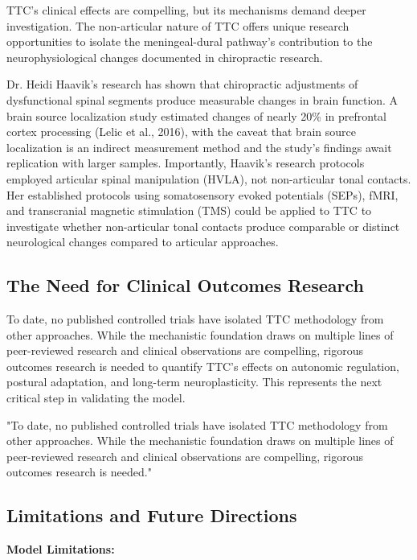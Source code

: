 \documentclass[11pt,letterpaper]{article}
\begin{document}
TTC's clinical effects are compelling, but its mechanisms demand deeper investigation. The non-articular nature of TTC offers unique research opportunities to isolate the meningeal-dural pathway's contribution to the neurophysiological changes documented in chiropractic research.


Dr. Heidi Haavik's research has shown that chiropractic adjustments of dysfunctional spinal segments produce measurable changes in brain function. A brain source localization study estimated changes of nearly 20\% in prefrontal cortex processing (Lelic et al., 2016), with the caveat that brain source localization is an indirect measurement method and the study's findings await replication with larger samples. Importantly, Haavik's research protocols employed articular spinal manipulation (HVLA), not non-articular tonal contacts. Her established protocols using somatosensory evoked potentials (SEPs), fMRI, and transcranial magnetic stimulation (TMS) could be applied to TTC to investigate whether non-articular tonal contacts produce comparable or distinct neurological changes compared to articular approaches.


\subsection{The Need for Clinical Outcomes Research}

To date, no published controlled trials have isolated TTC methodology from other approaches. While the mechanistic foundation draws on multiple lines of peer-reviewed research and clinical observations are compelling, rigorous outcomes research is needed to quantify TTC's effects on autonomic regulation, postural adaptation, and long-term neuroplasticity. This represents the next critical step in validating the model.


\begin{pullquotebox}
"To date, no published controlled trials have isolated TTC methodology from other approaches. While the mechanistic foundation draws on multiple lines of peer-reviewed research and clinical observations are compelling, rigorous outcomes research is needed."
\end{pullquotebox}


\subsection{Limitations and Future Directions}

\textbf{Model Limitations:}
\end{document}
